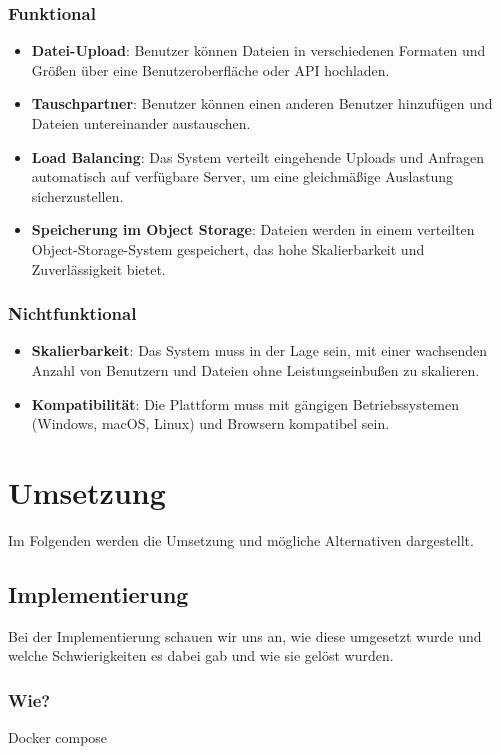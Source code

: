 \documentclass[12pt]{report}
\begin{document}
		\subsection{Funktional}
			\begin{itemize}
				\item \textbf{Datei-Upload}: Benutzer können Dateien in verschiedenen Formaten und Größen über eine Benutzeroberfläche oder API hochladen.
				\item \textbf{Tauschpartner}: Benutzer können einen anderen Benutzer hinzufügen und Dateien untereinander austauschen.
				\item \textbf{Load Balancing}: Das System verteilt eingehende Uploads und Anfragen automatisch auf verfügbare Server, um eine gleichmäßige Auslastung sicherzustellen.
				\item \textbf{Speicherung im Object Storage}: Dateien werden in einem verteilten Object-Storage-System gespeichert, das hohe Skalierbarkeit und Zuverlässigkeit bietet.
			\end{itemize}
		\subsection{Nichtfunktional}
			\begin{itemize}
				\item \textbf{Skalierbarkeit}: Das System muss in der Lage sein, mit einer wachsenden Anzahl von Benutzern und Dateien ohne Leistungseinbußen zu skalieren.
				\item \textbf{Kompatibilität}: Die Plattform muss mit gängigen Betriebssystemen (Windows, macOS, Linux) und Browsern kompatibel sein.
			\end{itemize}

\chapter{Umsetzung}
	Im Folgenden werden die Umsetzung und mögliche Alternativen dargestellt.
	\section{Implementierung}
		Bei der Implementierung schauen wir uns an, wie diese umgesetzt wurde und welche Schwierigkeiten es dabei gab und wie sie gelöst wurden.
		\subsection{Wie?}
			Docker compose 
			
\end{document}
